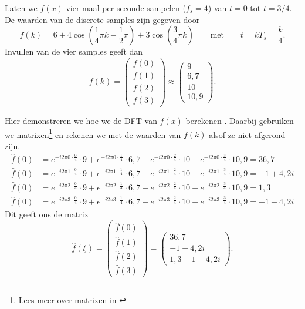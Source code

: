 \documentclass[11pt,fleqn]{book} %
\begin{document}
Laten we $f(x)$ vier maal per seconde sampelen ($f_s=4$) van $t=0$ tot $t=3/4$. De waarden van de discrete samples zijn gegeven door
\begin{displaymath}
f(k)=6+4\cos{\left(\frac{1}{4}\pi k -\frac{1}{2}\pi\right)}+3\cos{\left(\frac{3}{4}\pi k\right)}\qquad\text{met}\qquad t=kT_s=\frac{k}{4}.
\end{displaymath}
Invullen van de vier samples geeft dan
\begin{displaymath}
f(k)=\begin{pmatrix}f(0)\\f(1)\\f(2)\\f(3)\end{pmatrix}\approx \begin{pmatrix}9\\6,7\\10\\10,9\end{pmatrix}.
\end{displaymath}

Hier demonstreren we hoe we de DFT van $f(x)$ berekenen \cite{sr}. Daarbij gebruiken we matrixen\footnote{Lees meer over matrixen in \cite{mat}} en rekenen we met de waarden van $f(k)$ alsof ze niet afgerond zijn.
\begin{displaymath}
\begin{aligned}
\hat{f}(0)&=e^{-i2\pi 0\cdot\frac{0}{4}}\cdot 9+e^{-i2\pi 0\cdot\frac{1}{4}}\cdot 6,7+e^{-i2\pi 0\cdot\frac{2}{4}}\cdot 10+e^{-i2\pi 0\cdot\frac{3}{4}}\cdot 10,9=36,7\\
\hat{f}(0)& =e^{-i2\pi 1\cdot\frac{0}{4}}\cdot 9+e^{-i2\pi 1\cdot\frac{1}{4}}\cdot 6,7+e^{-i2\pi 1\cdot\frac{2}{4}}\cdot 10+e^{-i2\pi 1\cdot\frac{3}{4}}\cdot 10,9=-1+4,2i\\
\hat{f}(0)& =e^{-i2\pi 2\cdot\frac{0}{4}}\cdot 9+e^{-i2\pi 2\cdot\frac{1}{4}}\cdot 6,7+e^{-i2\pi 2\cdot\frac{2}{4}}\cdot 10+e^{-i2\pi 2\cdot\frac{3}{4}}\cdot 10,9=1,3\\
\hat{f}(0)& =e^{-i2\pi 3\cdot\frac{0}{4}}\cdot 9+e^{-i2\pi 3\cdot\frac{1}{4}}\cdot 6,7+e^{-i2\pi 3\cdot\frac{2}{4}}\cdot 10+e^{-i2\pi 3\cdot\frac{3}{4}}\cdot 10,9=-1-4,2i
\end{aligned}
\end{displaymath}
Dit geeft ons de matrix
\begin{displaymath}
\hat{f}(\xi)=\begin{pmatrix}\hat{f}(0)\\\hat{f}(1)\\\hat{f}(2)\\\hat{f}(3)\end{pmatrix}=\begin{pmatrix}36,7\\-1+4,2i\\1,3-1-4,2i\end{pmatrix}.
\end{displaymath}
\end{document}
